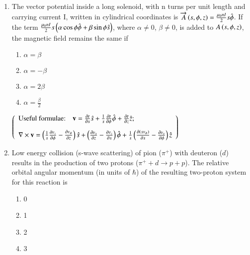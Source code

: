 \documentclass[journal,12pt,onecolumn]{IEEEtran}
\theoremstyle{remark}
\begin{document}
\begin{enumerate}
\item The vector potential inside a long solenoid, with n turns per unit length and carrying current I, written in cylindrical coordinates is $\overrightarrow{A}\left(s,\phi,z\right) = \frac{\mu_0nI}{2} s \hat{\phi}$. If the term $\frac{\mu_0nI}{2} s\left(\alpha\cos{\phi}\hat{\phi} + \beta\sin{\phi}\hat{s}\right)$, where $\alpha \neq 0$, $\beta \neq 0$, is added to $A\left(s,\phi,z\right)$, the magnetic field remains the same if
\begin{multicols}{4}
\begin{enumerate}
	\item $\alpha = \beta$
	\item $\alpha = -\beta$
	\item $\alpha = 2\beta$
	\item $\alpha = \frac{\beta}{2}$ 
\end{enumerate}
\end{multicols}

\begin{center}
$
\left(
\begin{array}{l}
	\text{Useful formulae:} \quad \mathbf{v} = \frac{\partial t}{\partial s} \hat{s} + \frac{1}{s} \frac{\partial t}{\partial \phi} \hat{\phi} + \frac{\partial t}{\partial z} \hat{z} ; \\[10pt]
	\mathbf{\nabla} \times \mathbf{v} = \left( \frac{1}{s} \frac{\partial v_z}{\partial \phi} - \frac{\partial v_{\phi}}{\partial z} \right) \hat{s} + \left( \frac{\partial v_s}{\partial z} - \frac{\partial v_z}{\partial s} \right) \hat{\phi} + \frac{1}{s} \left( \frac{\partial (s v_{\phi})}{\partial s} - \frac{\partial v_s}{\partial \phi} \right) \hat{z}
\end{array}
\right)
$
\end{center} 

\item Low energy collision (s-wave scattering) of pion ($\pi^+$) with deuteron ($d$) results in the production of two protons ($\pi^+ + d \rightarrow p + p$). The relative orbital angular momentum (in units of $\hbar$) of the resulting two-proton system for this reaction is
\begin{multicols}{4}
\begin{enumerate} 
	\item 0
	\item 1
	\item 2
	\item 3
\end{enumerate}
\end{multicols}


\end{enumerate}
\end{document}
